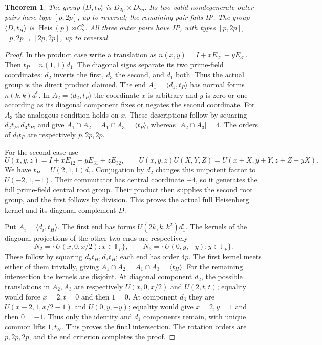 \documentclass[11pt]{article}
\newtheorem{theorem}{Theorem}\newtheorem{lemma}[theorem]{Lemma}
\newcommand{\F}{\mathbb F}\newcommand{\gen}[1]{\langle#1\rangle}
\begin{document}
\begin{theorem}\label{triangular}
The group $\gen{D,t_P}$ is $D_{2p}\times D_{2p}$. Its two valid
nondegenerate outer pairs have type $[p,2p]$, up to reversal; the
remaining pair fails IP. The group $\gen{D,t_H}$ is
$\operatorname{Heis}(p)\rtimes C_2^2$. All three outer pairs have IP,
with types $[p,2p]$, $[p,2p]$, $[2p,2p]$, up to reversal.
\end{theorem}
\begin{proof}
In the product case write a translation as $n(x,y)=I+xE_{21}+yE_{31}$.
Then $t_P=n(1,1)d_1$. The diagonal signs separate its two prime-field
coordinates: $d_2$ inverts the first, $d_3$ the second, and $d_1$
both. Thus the actual group is the direct product claimed.
The end $A_1=\gen{d_1,t_P}$ has normal forms $n(k,k)d_1^\epsilon$.
In $A_2=\gen{d_2,t_P}$ the coordinate $x$ is arbitrary and $y$ is
zero or one according as its diagonal component fixes or negates the
second coordinate. For $A_3$ the analogous condition holds on $x$.
These descriptions follow by squaring $d_2t_P,d_3t_P$, and give
$A_1\cap A_2=A_1\cap A_3=\gen{t_P}$, whereas $|A_2\cap A_3|=4$.
The orders of $d_it_P$ are respectively $p,2p,2p$.

For the second case use
\[
 U(x,y,z)=I+xE_{12}+yE_{31}+zE_{32},\qquad
 U(x,y,z)U(X,Y,Z)=U(x+X,y+Y,z+Z+yX).
\]
We have $t_H=U(2,1,1)d_1$. Conjugation by $d_2$ changes this
unipotent factor to $U(-2,1,-1)$. Their commutator has central
coordinate $-4$, so it generates the full prime-field central root
group. Their product then supplies the second root group, and the
first follows by division. This proves the actual full Heisenberg
kernel and its diagonal complement $D$.

Put $A_i=\gen{d_i,t_H}$. The first end has forms
$U(2k,k,k^2)d_1^\epsilon$. The kernels of the diagonal projections
of the other two ends are respectively
\[
 N_2=\{U(x,0,x/2):x\in\F_p\},\qquad
 N_3=\{U(0,y,-y):y\in\F_p\}.
\]
These follow by squaring $d_2t_H,d_3t_H$; each end has order $4p$.
The first kernel meets either of them trivially, giving
$A_1\cap A_2=A_1\cap A_3=\gen{t_H}$.
For the remaining intersection the kernels are disjoint. At diagonal
component $d_2$, the possible translations in $A_2,A_3$ are respectively
$U(x,0,x/2)$ and $U(2,t,t)$; equality would force $x=2,t=0$ and
then $1=0$. At component $d_3$ they are $U(x-2,1,x/2-1)$ and
$U(0,y,-y)$; equality would give $x=2,y=1$ and then $0=-1$.
Thus only the identity and $d_1$ components remain, with unique common
lifts $1,t_H$. This proves the final intersection. The rotation orders
are $p,2p,2p$, and the end criterion completes the proof.
\end{proof}
\end{document}
